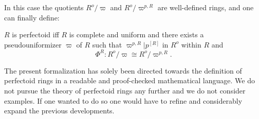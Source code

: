 \documentclass[11pt]{article}
\begin{document}
In this case the quotients $R^o/\varpi$ and $R^o/\varpi^{p,R}$ are well-defined
rings, and one can finally define:
\begin{forthel}
\begin{definition}
$R$ is perfectoid iff $R$ is complete and uniform and there
exists a pseudouniformizer $\varpi$ of $R$ such that    
$\varpi^{p,R} | p^{[R]}$ in $R^o$ within $R$
and 
$$\Phi^{R} : R^o / \varpi \cong R^o / \varpi^{p,R}.$$
\end{definition}

\end{forthel}

The present formalization has solely been directed towards 
the definition of perfectoid rings in a readable 
and proof-checked mathematical language. 
We do not pursue the theory of perfectoid rings any further
and we do not consider examples. If one wanted to do so one would 
have to refine and considerably expand the previous developments. 
\end{document}
